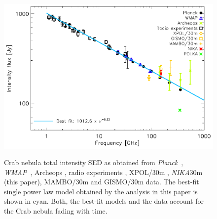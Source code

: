 \documentclass[twocolumn,traditabstract]{aa}
\def\NIKA{\textit{NIKA}}
\def\Planck{\textit{Planck}}
\def\WMAP{\textit{WMAP}}
\begin{document}

\begin{figure}
  \centering
          { \includegraphics[width=1\linewidth,keepaspectratio]{figures/Crab_SED_int_test.pdf}}
           \caption{Crab nebula total intensity SED as obtained from \Planck\ \citep{2015arXiv150702058P}, \WMAP\ \citep{2011ApJS..192...19W}, Archeops \citep{macias2007archeops}, radio experiments \citep{dmitrenko1970absolute, 1971IzVUZ..14..157V}, XPOL/30m \citep{aumont2010}, \NIKA\/30m (this paper), MAMBO/30m \citep{2002A&A...386.1044B} and GISMO/30m \citep{2011ApJ...734...54A} data. The best-fit single power law model obtained by the analysis in this paper is shown in cyan. Both, the best-fit models and the data account for the Crab nebula fading with time.}
\label{crab_SED}		
  \end{figure} 
\end{document}
